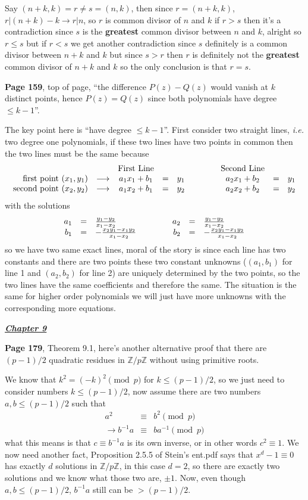 \documentclass[aps,preprint,preprintnumbers,nofootinbib,showpacs,prd]{revtex4-1}
\newcommand{\ie}{{\it i.e.} }
\newcommand{\nbea}{\begin{eqnarray*}}
\newcommand{\neea}{\end{eqnarray*}}
\begin{document}
Say $(n+k,k) = r \neq s = (n,k)$, then since $r=(n+k,k)$, $r|(n+k)-k \to r|n$, so $r$ is common divisor of $n$ and $k$ if $r > s$ then it's a contradiction since $s$ is the {\bf greatest} common divisor between $n$ and $k$, alright so $r \le s$ but if $r < s$ we get another contradiction since $s$ definitely is a common divisor between $n+k$ and $k$ but since $s > r$ then $r$ is definitely not the {\bf greatest} common divisor of $n+k$ and $k$ so the only conclusion is that $r=s$.

{\bf Page 159}, top of page, ``the difference $P(z) - Q(z)$ would vanish at $k$ distinct points, hence $P(z)=Q(z)$ since both polynomials have degree $\le k-1$''.

The key point here is ``have degree $\le k-1$''. First consider two straight lines, \ie two degree one polynomials, if these two lines have two points in common then the two lines must be the same because 
%
\nbea
\begin{array}{r c c c l c c c l}
& & {\rm First~Line} & & & ~~~~~~~ & {\rm Second~Line} \\
{\rm first~point~} (x_1,y_1) & \longrightarrow & a_1 x_1 + b_1 & = & y_1 & ~~~~~~~ & a_2 x_1 + b_2 & = & y_1 \\
{\rm second~point~} (x_2,y_2) & \longrightarrow & a_1 x_2 + b_1 & = & y_2 & ~~~~~~~ & a_2 x_2 + b_2 & = & y_2
\end{array}
\neea
%
with the solutions
%
\nbea
\begin{array}{r c l c r c l}
a_1 & = & \frac{y_1-y_2}{x_1-x_2} & ~~~~~~~ & a_2 & = & \frac{y_1-y_2}{x_1-x_2} \\
b_1 & = & -\frac{x_2y_1-x_1y_2}{x_1-x_2} & ~~~~~~~ & b_2 & = & -\frac{x_2y_1-x_1y_2}{x_1-x_2}
\end{array}
\neea
%
so we have two same exact lines, moral of the story is since each line has two constants and there are two points these two constant unknowns ($(a_1,b_1)$ for line 1 and $(a_2,b_2)$ for line 2) are uniquely determined by the two points, so the two lines have the same coefficients and therefore the same. The situation is the same for higher order polynomials we will just have more unknowns with the corresponding more equations.

\bigskip
\underline{\textbf{\textit{Chapter 9}}}
\bigskip

{\bf Page 179}, Theorem 9.1, here's another alternative proof that there are $(p-1)/2$ quadratic residues in $\mathbb{Z}/p\mathbb{Z}$ without using primitive roots.

We know that $k^2 = (-k)^2 \pmod{p}$ for $k \le (p-1)/2$, so we just need to consider numbers $k \le (p-1)/2$, now assume there are two numbers $a,b \le (p-1)/2$ such that
%
\nbea
a^2 & \equiv & b^2 \pmod{p} \\
\to b^{-1} a & \equiv & b a^{-1} \pmod{p}
\neea
%
what this means is that $c \equiv b^{-1} a$ is its own inverse, or in other words $c^2 \equiv 1$. We now need another fact, Proposition 2.5.5 of Stein's ent.pdf says that $x^d-1 \equiv 0$ has exactly $d$ solutions in $\mathbb{Z}/p\mathbb{Z}$, in this case $d=2$, so there are exactly two solutions and we know what those two are, $\pm 1$. Now, even though $a,b \le (p-1)/2$, $b^{-1}a$ still can be $> (p-1)/2$.
\end{document}
